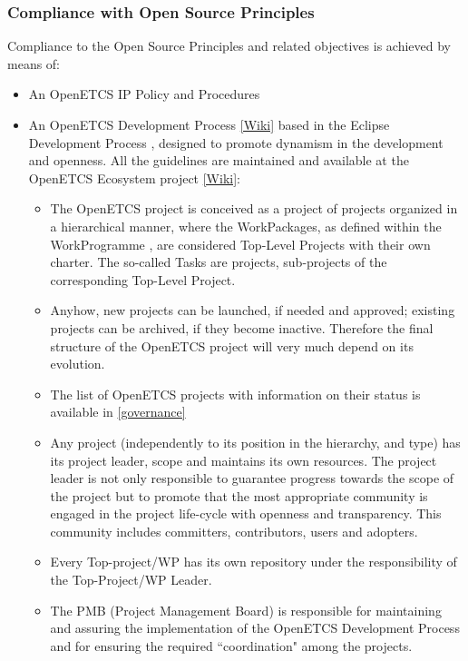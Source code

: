 \documentclass{template/openetcs_article}
\begin{document}
\subsubsection{Compliance with Open Source Principles}
Compliance to the Open Source Principles and related objectives is achieved by means of:
\begin{itemize}
\item An OpenETCS \gls{IP} Policy and Procedures \citep{IPP}
\item An OpenETCS Development Process \citep{odp} \href{https://github.com/openETCS/ecosystem/wiki/openETCS-Development-Process}{[Wiki]} based in the Eclipse Development Process \citep{EDP}, designed to promote dynamism in the development and openness. All the guidelines are maintained and available at the OpenETCS Ecosystem project \href{https://github.com/openETCS/ecosystem/wiki/_pages}{[Wiki]}: 
\begin{itemize}
\item The OpenETCS project is conceived as a project of projects organized in a hierarchical manner, where the WorkPackages, as defined within the WorkProgramme \citep{fpp}, are considered Top-Level Projects with their own charter. The so-called Tasks are projects, sub-projects of the corresponding Top-Level Project.
\item Anyhow, new projects can be launched, if needed and approved; existing projects can be archived, if they become inactive. Therefore the final structure of the OpenETCS project will very much depend on its evolution.  
\item The list of OpenETCS projects with information on their status is available in \href{https://github.com/openETCS/governance/wiki/State-of-Deliverables}{[governance]}
\item Any project (independently to its position in the hierarchy, and type) has its project leader, scope and maintains its own resources. The project leader is not only responsible to guarantee progress towards the scope of the project but to promote that the most appropriate community is engaged in the project life-cycle with openness and transparency. This community includes committers, contributors, users and adopters.
\item Every Top-project/\gls{WP} has its own repository under the responsibility of the Top-Project/\gls{WP} Leader.  
\item The PMB (Project Management Board) is responsible for maintaining and assuring the implementation of the OpenETCS Development Process and for ensuring the required “coordination" among the projects.

\end{itemize}
\end{itemize}
\end{document}
